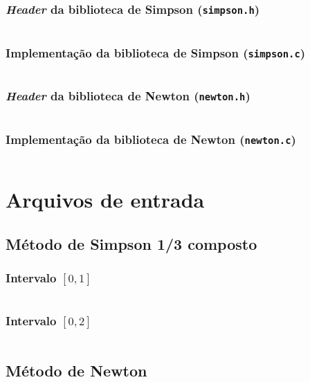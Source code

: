 \begin{apendicesenv}
		\subsection*{\emph{Header} da biblioteca de Simpson (\texttt{simpson.h})}
		\label{app:simpson.h}
			\inputminted[autogobble,breaklines,linenos,frame=lines,tabsize=4,obeytabs=true,fontsize=\footnotesize
			]{c}{source_codes/simpson.h}

		\subsection*{Implementação da biblioteca de Simpson (\texttt{simpson.c})}
			\label{app:simpson.c}
			\inputminted[autogobble,breaklines,linenos,frame=lines,tabsize=4,obeytabs=true,fontsize=\footnotesize
			]{c}{source_codes/simpson.c}

		\subsection*{\emph{Header} da biblioteca de Newton (\texttt{newton.h})}
		\label{app:newton.h}
			\inputminted[autogobble,breaklines,linenos,frame=lines,tabsize=4,obeytabs=true,fontsize=\footnotesize
			]{c}{source_codes/newton.h}

		\subsection*{Implementação da biblioteca de Newton (\texttt{newton.c})}
			\label{app:newton.c}
			\inputminted[autogobble,breaklines,linenos,frame=lines,tabsize=4,obeytabs=true,fontsize=\footnotesize
			]{c}{source_codes/newton.c}


\chapter{Arquivos de entrada}
\label{ch:inputs}
	\section{Método de Simpson 1/3 composto}
		\subsection*{Intervalo \([0, 1]\)}
			\label{app:input_simpson1}
			\inputminted[autogobble,breaklines,linenos,frame=lines,tabsize=4,obeytabs=true,fontsize=\footnotesize
			]{text}{source_codes/simpson1.in}

		\subsection*{Intervalo \([0, 2]\)}
			\label{app:input_simpson2}
			\inputminted[autogobble,breaklines,linenos,frame=lines,tabsize=4,obeytabs=true,fontsize=\footnotesize
			]{text}{source_codes/simpson2.in}

	\section{Método de Newton}
		\label{app:input_newton}
		\inputminted[autogobble,breaklines,linenos,frame=lines,tabsize=4,obeytabs=true,fontsize=\footnotesize
		]{text}{source_codes/newton1.in}

\end{apendicesenv}
